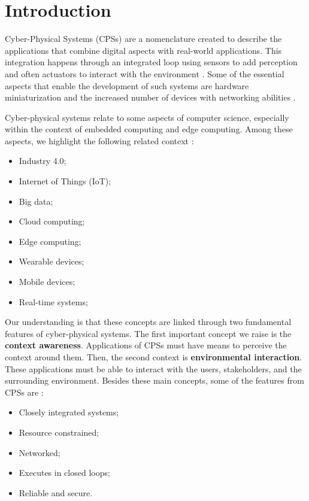 \chapter{Introduction}
\label{chap:intro}


Cyber-Physical Systems (CPSs) are a nomenclature created to describe the applications that combine digital aspects with real-world applications. This integration happens through an integrated loop using sensors to add perception and often actuators to interact with the environment \cite{zanero2017cyber}. Some of the essential aspects that enable the development of such systems are hardware miniaturization and the increased number of devices with networking abilities \cite{alguliyev2018cyber}.

Cyber-physical systems relate to some aspects of computer science, especially within the context of embedded computing and edge computing. Among these aspects, we highlight the following related context \cite{alguliyev2018cyber, baheti2011cyber}:

\begin{itemize}
    \item Industry 4.0;
    \item Internet of Things (IoT);
    \item Big data;
    \item Cloud computing;
    \item Edge computing;
    \item Wearable devices;
    \item Mobile devices;
    \item Real-time systems;
\end{itemize}

Our understanding is that these concepts are linked through two fundamental features of cyber-physical systems. The first important concept we raise is the \textbf{context awareness}. Applications of CPSs must have means to perceive the context around them. Then, the second context is \textbf{environmental interaction}. These applications must be able to interact with the users, stakeholders, and the surrounding environment. Besides these main concepts, some of the features from CPSs are \cite{shi2011survey}:

\begin{itemize}
    \item Closely integrated systems;
    \item Resource constrained;
    \item Networked;
    \item Executes in closed loops;
    \item Reliable and secure.
\end{itemize}

